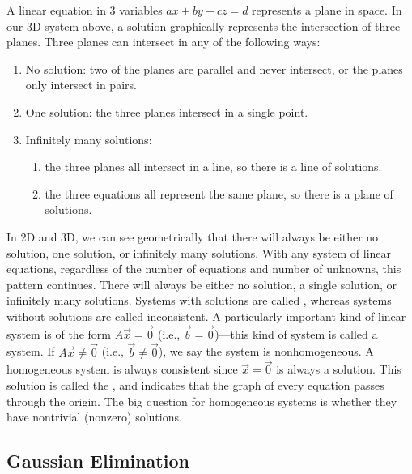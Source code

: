 A linear equation in 3 variables $ax+by+cz=d$ represents a plane in space.  
In our 3D system above, a solution graphically represents the intersection of three planes. 
Three planes can intersect in any of the following ways:
\begin{enumerate}
\item No solution: two of the planes are parallel and never intersect,
  or the planes only intersect in pairs.
\item One solution: the three planes intersect in a single point.
\item Infinitely many solutions:
\begin{enumerate}
	\item the three planes all intersect in a line, so there is a line of solutions.
	\item the three equations all represent the same plane, so there is a plane of solutions.
\end{enumerate}
\end{enumerate}
%
In 2D and 3D, we can see geometrically that there will always be either
no solution, one solution, or infinitely many solutions.
With any system of linear equations, regardless of the number of equations and number of unknowns, this pattern continues. 
There will always be either no solution, a single solution, or infinitely many solutions.
Systems with solutions are called ,
whereas systems without solutions are called inconsistent.
A particularly important kind of linear system is of the form $A\vec x
= \vec 0$ (i.e., $\vec b=\vec 0$)---this kind of system is called a
 system.
% 
If $A\vec x\neq \vec 0$ (i.e., $\vec b \neq \vec 0$), we say the
system is nonhomogeneous.  A homogeneous system is always consistent
since $\vec x=\vec 0$ is always a solution.  This solution is called
the , and indicates that the graph of every equation
passes through the origin.  The big question for homogeneous systems
is whether they have nontrivial (nonzero) solutions.

\subsection{Gaussian Elimination}


